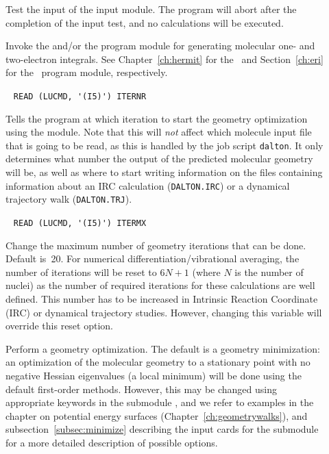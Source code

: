 \begin{description}
\item[] Test the input of the  input
module. The program will abort after the completion of the input test,
and no calculations will be executed.

\item[] Invoke the {\her} and/or the {\eri} program module for generating molecular one-
and two-electron integrals.
See Chapter~\ref{ch:hermit} for the \her\ and
Section~\ref{ch:eri} for the \eri\ program module, respectively.

\item[]\verb| |\newline
\verb|READ (LUCMD, '(I5)') ITERNR|

Tells the program at which iteration to start the geometry optimization
using the  module.
Note that this will {\em not} affect which molecule
input file that is going to be read, as this is handled by the
job script {\tt dalton}. It only determines what number the
output of the predicted molecular geometry will be, as well as where to start 
writing information on the files containing information about an IRC 
calculation (\verb|DALTON.IRC|) or a dynamical trajectory walk (\verb|DALTON.TRJ|).

\item[]\verb| |\newline
\verb|READ (LUCMD, '(I5)') ITERMX|

Change the maximum number of geometry iterations
that can be done. Default
is~20.  For numerical
differentiation/vibrational averaging, the number of iterations will
be reset to $6N+1$ (where $N$ is the number of nuclei) as the number
of required iterations for these calculations are well
defined. This number has to be increased in Intrinsic Reaction Coordinate
(IRC) or dynamical
trajectory studies. However, changing this variable will override this reset
option.


\item[] Perform a geometry optimization.
The default is a geometry minimization:
an optimization of the molecular geometry to a stationary point with no
negative Hessian eigenvalues
(a local minimum) will be done using the default first-order
methods. However, this may be changed using appropriate
keywords in the submodule , and we refer to examples in
the chapter on potential energy surfaces
(Chapter~\ref{ch:geometrywalks}), and subsection~\ref{subsec:minimize}
describing the input cards for the  submodule for a more
detailed description of possible options.


\end{description}
